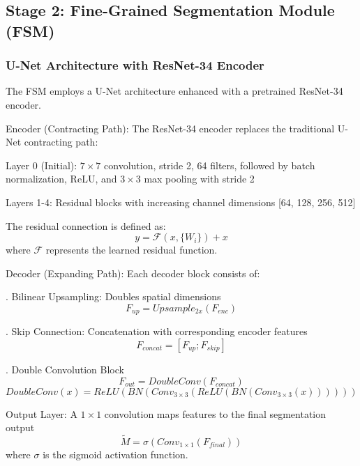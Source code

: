 \documentclass[runningheads]{llncs}
\begin{document}
\subsection{Stage 2: Fine-Grained Segmentation Module (FSM)}

\subsubsection{U-Net Architecture with ResNet-34 Encoder}
The FSM employs a U-Net architecture enhanced with a pretrained ResNet-34 encoder.


\noindent Encoder (Contracting Path): The ResNet-34 encoder replaces the traditional U-Net contracting path:

\noindent Layer 0 (Initial): $7\times7$ convolution, stride 2, 64 filters, followed by batch normalization, ReLU, and $3\times3$ max pooling with stride 2

\noindent Layers 1-4: Residual blocks with increasing channel dimensions [64, 128, 256, 512]

The residual connection is defined as:
\begin{equation}
y=\mathcal{F}(x,\{W_{i}\})+x
\end{equation}
where $\mathcal{F}$ represents the learned residual function.

\noindent Decoder (Expanding Path): Each decoder block consists of:

. Bilinear Upsampling: Doubles spatial dimensions
\begin{equation}
F_{up}=Upsample_{2x}(F_{enc})
\end{equation}

. Skip Connection: Concatenation with corresponding encoder features
\begin{equation}
F_{concat}=[F_{up};F_{skip}]
\end{equation}

. Double Convolution Block
\begin{equation}
F_{out}=DoubleConv(F_{concat})
\end{equation}
\begin{equation}
DoubleConv(x)=ReLU(BN(Conv_{3\times3}(ReLU(BN(Conv_{3\times3}(x))))))
\end{equation}

\noindent Output Layer: A $1\times1$ convolution maps features to the final segmentation output
\begin{equation}
\tilde{M}=\sigma(Conv_{1\times1}(F_{final}))
\end{equation}
where $\sigma$ is the sigmoid activation function.
\end{document}

